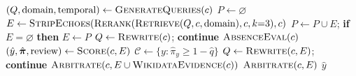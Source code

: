 \begin{algorithm}[htbp]
\caption{Verification of a single claim $c$}
\label{alg:verify}
\begin{algorithmic}[1]
\State $(Q, \text{domain}, \text{temporal}) \gets \textsc{GenerateQueries}(c)$
\State $P \gets \varnothing$ 
  \State $E \gets \textsc{StripEchoes}(\textsc{Rerank}(\textsc{Retrieve}(Q, c, \text{domain}), c, k{=}3), c)$
  \State $P \gets P \cup E$; \textbf{if} $E = \varnothing$ \textbf{then} $E \gets P$
     $Q \gets \textsc{Rewrite}(c)$; \textbf{continue} \EndIf
    \State \Return $\textsc{AbsenceEval}(c)$
  \EndIf
  \State $(\hat{y}, \hat{\bm{\pi}}, \text{review}) \gets \textsc{Score}(c, E)$ 
  \State $\mathcal{C} \gets \{ y : \hat{\pi}_y \ge 1 - \hat{q} \}$ 
   $Q \gets \textsc{Rewrite}(c, E)$; \textbf{continue} \EndIf
   
    \State \Return $\textsc{Arbitrate}(c, E \cup \textsc{WikidataEvidence}(c))$
    \State \Return $\textsc{Arbitrate}(c, E)$
  \EndIf
  \State \Return $\hat{y}$
\EndFor
\end{algorithmic}
\end{algorithm}
